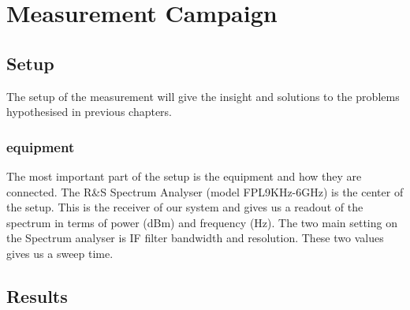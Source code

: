 \chapter{Measurement Campaign}
\section{Setup}
The setup of the measurement will give the insight and solutions to the problems hypothesised in previous chapters. 
\subsection{equipment}
The most important part of the setup is the equipment and how they are connected. The R\&S Spectrum Analyser (model FPL9KHz-6GHz) is the center of the setup. This is the receiver of our system and gives us a readout of the spectrum in terms of power (dBm) and frequency (Hz). The two main setting on the Spectrum analyser is IF filter bandwidth and resolution. These two values gives us a sweep time.
\section{Results}